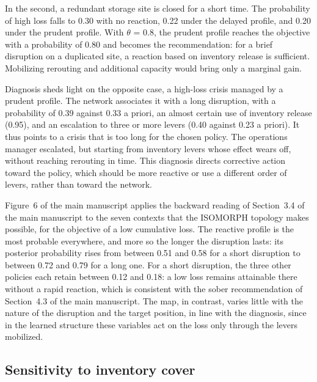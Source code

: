 In the second, a redundant storage site is closed for a short time. The probability of high loss falls to 0.30 with no reaction, 0.22 under the delayed profile, and 0.20 under the prudent profile. With $\theta$ = 0.8, the prudent profile reaches the objective with a probability of 0.80 and becomes the recommendation: for a brief disruption on a duplicated site, a reaction based on inventory release is sufficient. Mobilizing rerouting and additional capacity would bring only a marginal gain.

\begin{center}

\label{fig:d7}
\end{center}

Diagnosis sheds light on the opposite case, a high-loss crisis managed by a prudent profile. The network associates it with a long disruption, with a probability of 0.39 against 0.33 a priori, an almost certain use of inventory release (0.95), and an escalation to three or more levers (0.40 against 0.23 a priori). It thus points to a crisis that is too long for the chosen policy. The operations manager escalated, but starting from inventory levers whose effect wears off, without reaching rerouting in time. This diagnosis directs corrective action toward the policy, which should be more reactive or use a different order of levers, rather than toward the network.

Figure~6 of the main manuscript applies the backward reading of Section~3.4 of the main manuscript to the seven contexts that the ISOMORPH topology makes possible, for the objective of a low cumulative loss. The reactive profile is the most probable everywhere, and more so the longer the disruption lasts: its posterior probability rises from between 0.51 and 0.58 for a short disruption to between 0.72 and 0.79 for a long one. For a short disruption, the three other policies each retain between 0.12 and 0.18: a low loss remains attainable there without a rapid reaction, which is consistent with the sober recommendation of Section~4.3 of the main manuscript. The map, in contrast, varies little with the nature of the disruption and the target position, in line with the diagnosis, since in the learned structure these variables act on the loss only through the levers mobilized.

\subsection{Sensitivity to inventory cover}
\label{sec:S6.4}

